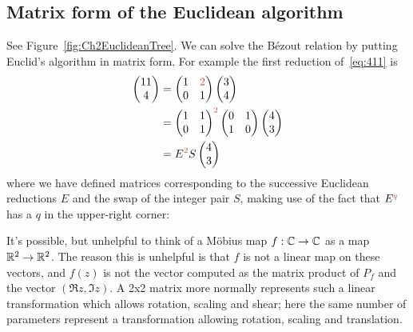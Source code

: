 \subsection{Matrix form of the Euclidean algorithm}
%
See Figure~\ref{fig:Ch2EuclideanTree}. 
We can solve the B\'ezout relation by putting  Euclid's algorithm in matrix form. For example
the first reduction of~\eqref{eq:411} is
\begin{align*}
\begin{pmatrix} 11 \\ 4 \end{pmatrix}  &= \begin{pmatrix} 1 & \jqn{2} \\ 0 & 1\end{pmatrix} \begin{pmatrix} 3 \\ 4\end{pmatrix} 
\\
&
= \begin{pmatrix} 1 &1 \\ 0 & 1\end{pmatrix}^{\jqn{2}}  \begin{pmatrix} 0 & 1  \\ 1 & 0  \end{pmatrix} \begin{pmatrix} 4 \\ 3 \end{pmatrix}
\\
&=
E^{\jqn{2}} S \begin{pmatrix} 4 \\ 3 \end{pmatrix}
\end{align*}
where we have defined matrices corresponding to the successive Euclidean reductions $E$ and the swap of the integer pair $S$, making use of the fact that $E^\jq$ has a $q$ in the upper-right corner:

It's possible, but unhelpful to think of a M\"obius map $f:\mathbb{C}\rightarrow\mathbb{C}$ as a  map $\mathbb{R}^2\rightarrow\mathbb{R}^2$.  The reason this is unhelpful is that $f$ is not a linear map on these vectors, and $f(z)$ is not the vector computed as the matrix product of $P_f$ and the vector $(\Re{z},\Im{z})$. A 2x2 matrix more normally represents such a linear transformation which allows rotation, scaling and shear; here the same number of parameters represent a transformation allowing rotation, scaling and translation. 

